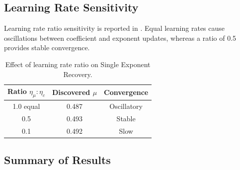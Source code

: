 \documentclass{article}
\theoremstyle{plain}
\theoremstyle{definition}
\theoremstyle{remark}
\begin{document}
\subsection{Learning Rate Sensitivity}

Learning rate ratio sensitivity is reported in . Equal learning rates cause oscillations between coefficient and exponent updates, whereas a ratio of 0.5 provides stable convergence.
\begin{table}[h!]
	\centering
	\caption{Effect of learning rate ratio on Single Exponent Recovery.}
	\label{tab:lr_ratio}
	\begin{tabular}{ccc}
		\arrayrulecolor{tablerule}\toprule
		\rowcolor{tableheader}
		Ratio $\eta_\mu:\eta_c$ & Discovered $\mu$ & Convergence \\
		\midrule
		1.0 equal               & 0.487            & Oscillatory \\
		\rowcolor{tablerowalt}
		0.5                     & 0.493            & Stable      \\
		0.1                     & 0.492            & Slow        \\
		\bottomrule
	\end{tabular}
\end{table}

\subsection{Summary of Results}
\end{document}
